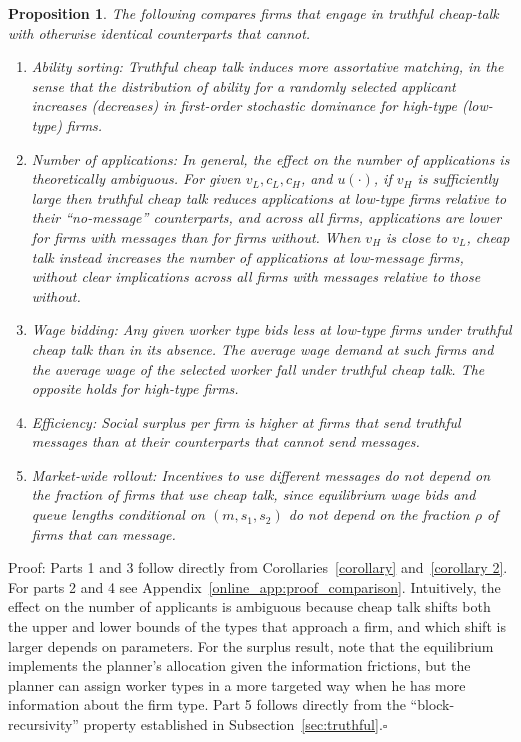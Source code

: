 \documentclass[12pt]{article}
\newtheorem{prop}{Proposition}
\begin{document}
\begin{prop}
\label{comparison1} The following compares firms that engage in truthful
cheap-talk with otherwise identical counterparts that cannot.

\begin{enumerate}
\item Ability sorting: Truthful cheap talk induces more assortative matching, in the sense that the distribution of ability for a randomly selected applicant increases (decreases) in first-order stochastic dominance for high-type (low-type) firms.

\item Number of applications: In general, the effect on the number of applications is theoretically ambiguous. For given $v_{L},c_{L},c_{H}$, and $u(\cdot)$, if $v_{H}$ is sufficiently large then truthful cheap talk reduces applications at low-type firms relative to their ``no-message'' counterparts, and across all firms, applications are lower for firms with messages than for firms without. When $v_{H}$ is close to $v_{L}$, cheap talk instead increases the number of applications at low-message firms, without clear implications across all firms with messages relative to those without.

\item Wage bidding: Any given worker type bids less at low-type firms under truthful cheap talk than in its absence. The average wage demand at such firms and the average wage of the selected worker fall under truthful cheap talk. The opposite holds for high-type firms.

\item Efficiency: Social surplus per firm is higher at firms that send truthful messages than at their counterparts that cannot send messages.

\item Market-wide rollout: Incentives to use different messages do not depend on the fraction of firms that use cheap talk, since equilibrium wage bids and queue lengths conditional on $(m,s_{1},s_{2})$ do not depend on the fraction $\rho$ of firms that can message.
\end{enumerate}
\end{prop}

Proof: Parts 1 and 3 follow directly from Corollaries~\ref{corollary} and~\ref{corollary 2}. For parts 2 and 4 see Appendix~\ref{online_app:proof_comparison}. Intuitively, the effect on the number of applicants is ambiguous because cheap talk shifts both the upper and lower bounds of the types that approach a firm, and which shift is larger depends on parameters. For the surplus result, note that the equilibrium implements the planner's allocation given the information frictions, but the planner can assign worker types in a more targeted way when he has more information about the firm type. Part 5 follows directly from the ``block-recursivity'' property established in Subsection~\ref{sec:truthful}.$\square$
\end{document}
